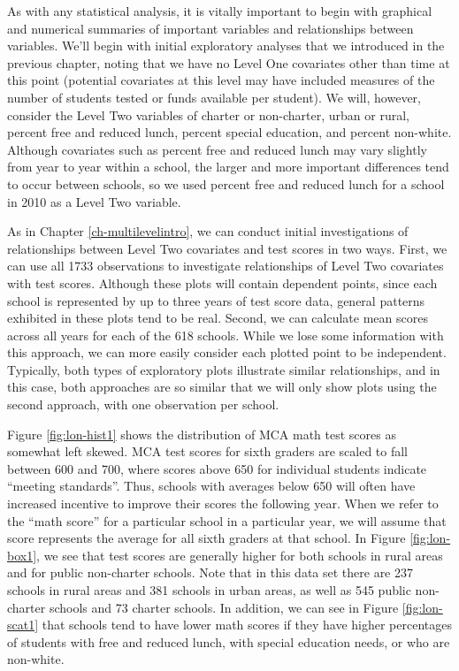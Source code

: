 \documentclass[
]{krantz}
\begin{document}
As with any statistical analysis, it is vitally important to begin with graphical and numerical summaries of important variables and relationships between variables. We'll begin with initial exploratory analyses that we introduced in the previous chapter, noting that we have no Level One covariates other than time at this point (potential covariates at this level may have included measures of the number of students tested or funds available per student). We will, however, consider the Level Two variables of charter or non-charter, urban or rural, percent free and reduced lunch, percent special education, and percent non-white. Although covariates such as percent free and reduced lunch may vary slightly from year to year within a school, the larger and more important differences tend to occur between schools, so we used percent free and reduced lunch for a school in 2010 as a Level Two variable.

As in Chapter \ref{ch-multilevelintro}, we can conduct initial investigations of relationships between Level Two covariates and test scores in two ways. First, we can use all 1733 observations to investigate relationships of Level Two covariates with test scores. Although these plots will contain dependent points, since each school is represented by up to three years of test score data, general patterns exhibited in these plots tend to be real. Second, we can calculate mean scores across all years for each of the 618 schools. While we lose some information with this approach, we can more easily consider each plotted point to be independent. Typically, both types of exploratory plots illustrate similar relationships, and in this case, both approaches are so similar that we will only show plots using the second approach, with one observation per school.

Figure \ref{fig:lon-hist1} shows the distribution of MCA math test scores as somewhat left skewed. MCA test scores for sixth graders are scaled to fall between 600 and 700, where scores above 650 for individual students indicate ``meeting standards''. Thus, schools with averages below 650 will often have increased incentive to improve their scores the following year. When we refer to the ``math score'' for a particular school in a particular year, we will assume that score represents the average for all sixth graders at that school. In Figure \ref{fig:lon-box1}, we see that test scores are generally higher for both schools in rural areas and for public non-charter schools. Note that in this data set there are 237 schools in rural areas and 381 schools in urban areas, as well as 545 public non-charter schools and 73 charter schools. In addition, we can see in Figure \ref{fig:lon-scat1} that schools tend to have lower math scores if they have higher percentages of students with free and reduced lunch, with special education needs, or who are non-white.
\end{document}
